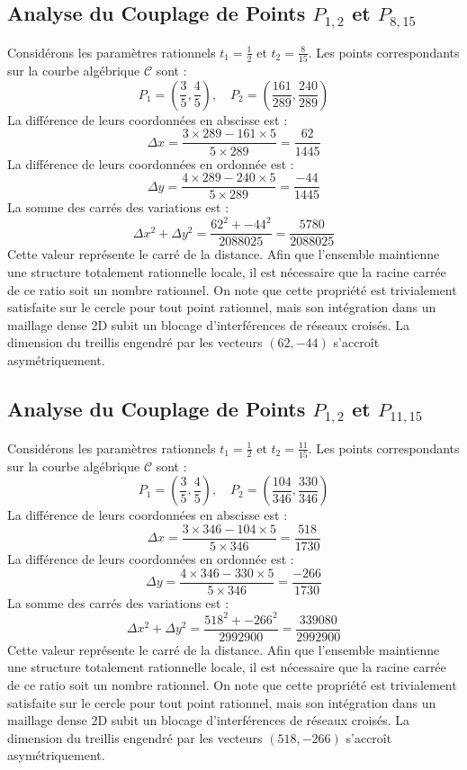 \documentclass[12pt, a4paper]{article}
\begin{document}
\subsection{Analyse du Couplage de Points $P_{1,2}$ et $P_{8,15}$}
Considérons les paramètres rationnels $t_1 = \frac{1}{2}$ et $t_2 = \frac{8}{15}$.
Les points correspondants sur la courbe algébrique $\mathcal{C}$ sont :
$$ P_1 = \left( \frac{3}{5}, \frac{4}{5} \right), \quad P_2 = \left( \frac{161}{289}, \frac{240}{289} \right) $$
La différence de leurs coordonnées en abscisse est :
$$ \Delta x = \frac{3 \times 289 - 161 \times 5}{5 \times 289} = \frac{62}{1445} $$
La différence de leurs coordonnées en ordonnée est :
$$ \Delta y = \frac{4 \times 289 - 240 \times 5}{5 \times 289} = \frac{-44}{1445} $$
La somme des carrés des variations est :
$$ \Delta x^2 + \Delta y^2 = \frac{ 62^2 + -44^2 }{ 2088025 } = \frac{ 5780 }{ 2088025 } $$
Cette valeur représente le carré de la distance. Afin que l'ensemble maintienne une structure totalement rationnelle locale, il est nécessaire que la racine carrée de ce ratio soit un nombre rationnel. On note que cette propriété est trivialement satisfaite sur le cercle pour tout point rationnel, mais son intégration dans un maillage dense 2D subit un blocage d'interférences de réseaux croisés. La dimension du treillis engendré par les vecteurs $( 62, -44 )$ s'accroît asymétriquement.


\subsection{Analyse du Couplage de Points $P_{1,2}$ et $P_{11,15}$}
Considérons les paramètres rationnels $t_1 = \frac{1}{2}$ et $t_2 = \frac{11}{15}$.
Les points correspondants sur la courbe algébrique $\mathcal{C}$ sont :
$$ P_1 = \left( \frac{3}{5}, \frac{4}{5} \right), \quad P_2 = \left( \frac{104}{346}, \frac{330}{346} \right) $$
La différence de leurs coordonnées en abscisse est :
$$ \Delta x = \frac{3 \times 346 - 104 \times 5}{5 \times 346} = \frac{518}{1730} $$
La différence de leurs coordonnées en ordonnée est :
$$ \Delta y = \frac{4 \times 346 - 330 \times 5}{5 \times 346} = \frac{-266}{1730} $$
La somme des carrés des variations est :
$$ \Delta x^2 + \Delta y^2 = \frac{ 518^2 + -266^2 }{ 2992900 } = \frac{ 339080 }{ 2992900 } $$
Cette valeur représente le carré de la distance. Afin que l'ensemble maintienne une structure totalement rationnelle locale, il est nécessaire que la racine carrée de ce ratio soit un nombre rationnel. On note que cette propriété est trivialement satisfaite sur le cercle pour tout point rationnel, mais son intégration dans un maillage dense 2D subit un blocage d'interférences de réseaux croisés. La dimension du treillis engendré par les vecteurs $( 518, -266 )$ s'accroît asymétriquement.
\end{document}
